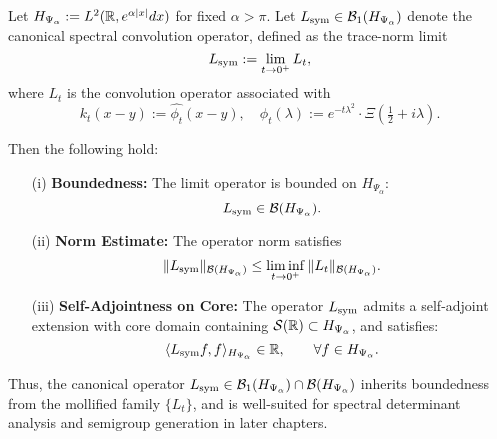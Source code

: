 \begin{lemma}
\label{lem:boundedness_Lsym}
Let \( H_{\Psi_\alpha} := L^2(\mathbb{R}, e^{\alpha |x|} dx) \) for fixed \( \alpha > \pi \). Let \( L_{\mathrm{sym}} \in \mathcal{B}_1(H_{\Psi_\alpha}) \) denote the canonical spectral convolution operator, defined as the trace-norm limit
\[
L_{\mathrm{sym}} := \lim_{t \to 0^+} L_t,
\]
where \( L_t \) is the convolution operator associated with
\[
k_t(x - y) := \widehat{\phi_t}(x - y), \quad \phi_t(\lambda) := e^{-t\lambda^2} \cdot \Xi\left( \tfrac{1}{2} + i\lambda \right).
\]

Then the following hold:
\begin{enumerate}
  \item[\textnormal{(i)}] \textbf{Boundedness:}  
  The limit operator is bounded on \( H_{\Psi_\alpha} \):
  \[
  L_{\mathrm{sym}} \in \mathcal{B}(H_{\Psi_\alpha}).
  \]

  \item[\textnormal{(ii)}] \textbf{Norm Estimate:}  
  The operator norm satisfies
  \[
  \| L_{\mathrm{sym}} \|_{\mathcal{B}(H_{\Psi_\alpha})} \le \liminf_{t \to 0^+} \| L_t \|_{\mathcal{B}(H_{\Psi_\alpha})}.
  \]

  \item[\textnormal{(iii)}] \textbf{Self-Adjointness on Core:}  
  The operator \( L_{\mathrm{sym}} \) admits a self-adjoint extension with core domain containing \( \mathcal{S}(\mathbb{R}) \subset H_{\Psi_\alpha} \), and satisfies:
  \[
  \langle L_{\mathrm{sym}} f, f \rangle_{H_{\Psi_\alpha}} \in \mathbb{R}, \qquad \forall f \in H_{\Psi_\alpha}.
  \]
\end{enumerate}

\noindent
Thus, the canonical operator \( L_{\mathrm{sym}} \in \mathcal{B}_1(H_{\Psi_\alpha}) \cap \mathcal{B}(H_{\Psi_\alpha}) \) inherits boundedness from the mollified family \( \{L_t\} \), and is well-suited for spectral determinant analysis and semigroup generation in later chapters.
\end{lemma}
